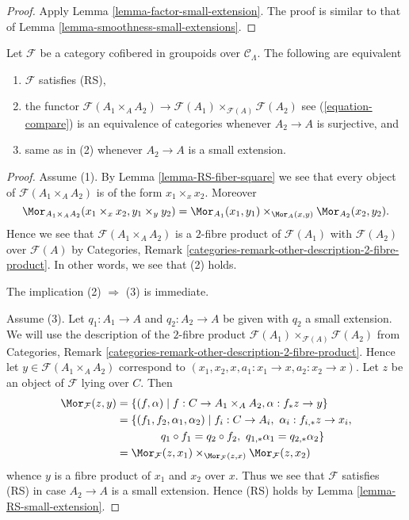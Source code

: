 \begin{proof}
Apply Lemma \ref{lemma-factor-small-extension}.  The proof is similar to that
of Lemma \ref{lemma-smoothness-small-extensions}.
\end{proof}

\begin{lemma}
\label{lemma-RS-2-categorical}
Let $\mathcal{F}$ be a category cofibered in groupoids over
$\mathcal{C}_\Lambda$. The following are equivalent
\begin{enumerate}
\item $\mathcal{F}$ satisfies (RS),
\item the functor
$\mathcal{F}(A_1 \times_A A_2) \to
\mathcal{F}(A_1) \times_{\mathcal{F}(A)} \mathcal{F}(A_2)$
see (\ref{equation-compare}) is an equivalence of
categories whenever $A_2 \to A$ is surjective, and
\item same as in (2) whenever $A_2 \to A$ is a small extension.
\end{enumerate}
\end{lemma}

\begin{proof}
Assume (1). By
Lemma \ref{lemma-RS-fiber-square}
we see that every object of $\mathcal{F}(A_1 \times_A A_2)$
is of the form $x_1 \times_x x_2$. Moreover
$$
\Mor_{A_1 \times_A A_2}(x_1 \times_x x_2, y_1 \times_y y_2) =
\Mor_{A_1}(x_1, y_1) \times_{\Mor_A(x, y)}
\Mor_{A_2}(x_2, y_2).
$$
Hence we see that $\mathcal{F}(A_1 \times_A A_2)$ is a $2$-fibre product
of $\mathcal{F}(A_1)$ with $\mathcal{F}(A_2)$ over $\mathcal{F}(A)$ by
Categories, Remark \ref{categories-remark-other-description-2-fibre-product}.
In other words, we see that (2) holds.

\medskip\noindent
The implication (2) $\Rightarrow$ (3) is immediate.

\medskip\noindent
Assume (3). Let $q_1 : A_1 \to A$ and $q_2 : A_2 \to A$ be given with
$q_2$ a small extension. We will use the description of the $2$-fibre product
$\mathcal{F}(A_1) \times_{\mathcal{F}(A)} \mathcal{F}(A_2)$ from
Categories, Remark \ref{categories-remark-other-description-2-fibre-product}.
Hence let $y \in \mathcal{F}(A_1 \times_A A_2)$ correspond to
$(x_1, x_2, x, a_1 : x_1 \to x, a_2 : x_2 \to x)$.
Let $z$ be an object of $\mathcal{F}$ lying over $C$. Then
\begin{align*}
\Mor_\mathcal{F}(z, y) & =
\{(f, \alpha) \mid f : C \to A_1 \times_A A_2,
\alpha : f_*z \to y\} \\
& = \{(f_1, f_2, \alpha_1, \alpha_2) \mid
f_i : C \to A_i, \ \alpha_i : f_{i, *}z \to x_i, \\
& \quad\quad\quad\quad
q_1 \circ f_1 = q_2 \circ f_2, \ q_{1, *} \alpha_1 = q_{2, *}\alpha_2\} \\
& =
\Mor_\mathcal{F}(z, x_1) \times_{\Mor_\mathcal{F}(z, x)}
\Mor_\mathcal{F}(z, x_2)
\end{align*}
whence $y$ is a fibre product of $x_1$ and $x_2$ over $x$. Thus we see
that $\mathcal{F}$ satisfies (RS) in case $A_2 \to A$ is a small extension.
Hence (RS) holds by
Lemma \ref{lemma-RS-small-extension}.
\end{proof}

